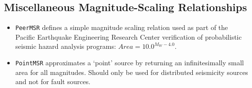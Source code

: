 \subsection{Miscellaneous Magnitude-Scaling Relationships}
\begin{itemize}
    \item \verb=PeerMSR= defines a simple magnitude scaling relation used as part of the Pacific Earthquake Engineering Research Center verification of probabilistic seismic hazard analysis programs: $Area = 10.0 ^{M_W - 4.0}$.
    \item \verb=PointMSR= approximates a `point' source by returning an infinitesimally small area for all magnitudes. Should only be used for distributed seismicity sources and not for fault sources. 
\end{itemize}

%
